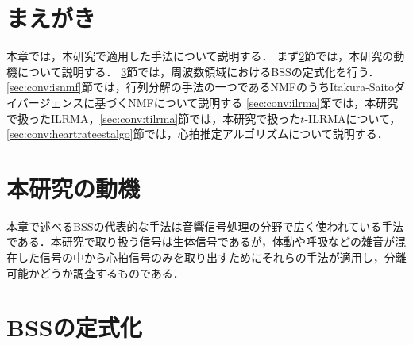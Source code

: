 \section{まえがき}
本章では，本研究で適用した手法について説明する．
まず\ref{sec:conv:researchmotivation}節では，本研究の動機について説明する．
\ref{sec:conv:bssformularization}節では，周波数領域におけるBSSの定式化を行う．
\ref{sec:conv:isnmf}節では，行列分解の手法の一つであるNMFのうちItakura-Saitoダイバージェンスに基づくNMFについて説明する
\ref{sec:conv:ilrma}節では，本研究で扱ったILRMA，\ref{sec:conv:tilrma}節では，本研究で扱った$t$-ILRMAについて，\ref{sec:conv:heartrateestalgo}節では，心拍推定アルゴリズムについて説明する．

\section{本研究の動機}
\label{sec:conv:researchmotivation}
本章で述べるBSSの代表的な手法は音響信号処理の分野で広く使われている手法である．本研究で取り扱う信号は生体信号であるが，体動や呼吸などの雑音が混在した信号の中から心拍信号のみを取り出すためにそれらの手法が適用し，分離可能かどうか調査するものである．

\section{BSSの定式化}
\label{sec:conv:bssformularization}

